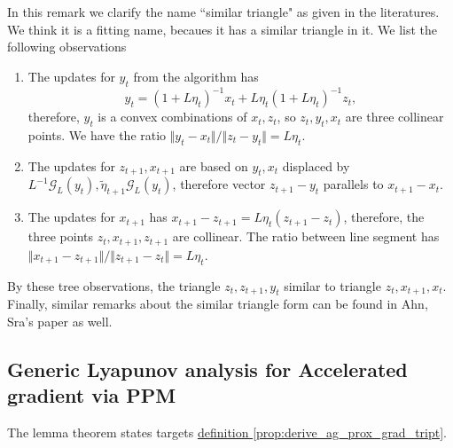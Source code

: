         \begin{remark}
            In this remark we clarify the name ``similar triangle" as given in the literatures. 
            We think it is a fitting name, becaues it has a similar triangle in it. 
            We list the following observations
            \begin{enumerate}
                \item 
                The updates for $y_{t}$ from the algorithm has 
                $$
                    y_t = (1 + L\eta_t)^{-1} x_t + L\eta_t(1 + L\eta_t)^{-1} z_t, 
                $$
                therefore, $y_t$ is a convex combinations of $x_t, z_t$, so $z_t, y_t, x_t$ are three collinear points. 
                We have the ratio $\Vert y_t - x_t\Vert/\Vert z_t - y_t\Vert = L\eta_t$. 
                \item 
                The updates for $z_{t + 1}, x_{t + 1}$ are based on $y_t, x_t$ displaced by $L^{-1} \mathcal G_L(y_t), \tilde\eta_{t +1} \mathcal G_L(y_t)$, therefore vector $z_{t + 1} - y_t$ parallels to $x_{t + 1} - x_t$. 
                \item The updates for $x_{t + 1}$ has $x_{t + 1} - z_{t + 1} = L\eta_t \left(z_{t + 1} - z_t\right)$, therefore, the three points $z_t, x_{t + 1}, z_{t + 1}$ are collinear. 
                The ratio between line segment has $\Vert x_{t + 1} - z_{t + 1}\Vert/\Vert z_{t + 1} - z_t\Vert = L\eta_t$. 
            \end{enumerate}
            By these tree observations, the triangle $z_{t}, z_{t + 1}, y_t$ similar to triangle $z_t, x_{t + 1}, x_t$. 
            Finally, similar remarks about the similar triangle form can be found in Ahn, Sra's paper \cite{ahn_understanding_2022} as well. 
            
        \end{remark}
        

\subsection{Generic Lyapunov analysis for Accelerated gradient via PPM}
\label{sec:generic_ag_ppm_lyapunov_analysis}
    The lemma theorem states targets
    \hyperref[prop:derive_ag_prox_grad_tript]
    {definition \ref*{prop:derive_ag_prox_grad_tript}}. 

